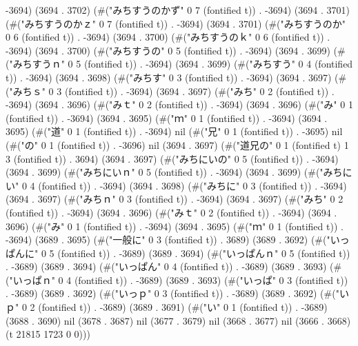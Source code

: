 -3694) (3694 . 3702) (#("みちすうのかず" 0 7 (fontified t)) . -3694) (3694 . 3701) (#("みちすうのかｚ" 0 7 (fontified t)) . -3694) (3694 . 3701) (#("みちすうのか" 0 6 (fontified t)) . -3694) (3694 . 3700) (#("みちすうのｋ" 0 6 (fontified t)) . -3694) (3694 . 3700) (#("みちすうの" 0 5 (fontified t)) . -3694) (3694 . 3699) (#("みちすうｎ" 0 5 (fontified t)) . -3694) (3694 . 3699) (#("みちすう" 0 4 (fontified t)) . -3694) (3694 . 3698) (#("みちす" 0 3 (fontified t)) . -3694) (3694 . 3697) (#("みちｓ" 0 3 (fontified t)) . -3694) (3694 . 3697) (#("みち" 0 2 (fontified t)) . -3694) (3694 . 3696) (#("みｔ" 0 2 (fontified t)) . -3694) (3694 . 3696) (#("み" 0 1 (fontified t)) . -3694) (3694 . 3695) (#("ｍ" 0 1 (fontified t)) . -3694) (3694 . 3695) (#("道" 0 1 (fontified t)) . -3694) nil (#("兄" 0 1 (fontified t)) . -3695) nil (#("の" 0 1 (fontified t)) . -3696) nil (3694 . 3697) (#("道兄の" 0 1 (fontified t) 1 3 (fontified t)) . 3694) (3694 . 3697) (#("みちにいの" 0 5 (fontified t)) . -3694) (3694 . 3699) (#("みちにいｎ" 0 5 (fontified t)) . -3694) (3694 . 3699) (#("みちにい" 0 4 (fontified t)) . -3694) (3694 . 3698) (#("みちに" 0 3 (fontified t)) . -3694) (3694 . 3697) (#("みちｎ" 0 3 (fontified t)) . -3694) (3694 . 3697) (#("みち" 0 2 (fontified t)) . -3694) (3694 . 3696) (#("みｔ" 0 2 (fontified t)) . -3694) (3694 . 3696) (#("み" 0 1 (fontified t)) . -3694) (3694 . 3695) (#("ｍ" 0 1 (fontified t)) . -3694) (3689 . 3695) (#("一般に" 0 3 (fontified t)) . 3689) (3689 . 3692) (#("いっぱんに" 0 5 (fontified t)) . -3689) (3689 . 3694) (#("いっぱんｎ" 0 5 (fontified t)) . -3689) (3689 . 3694) (#("いっぱん" 0 4 (fontified t)) . -3689) (3689 . 3693) (#("いっぱｎ" 0 4 (fontified t)) . -3689) (3689 . 3693) (#("いっぱ" 0 3 (fontified t)) . -3689) (3689 . 3692) (#("いっｐ" 0 3 (fontified t)) . -3689) (3689 . 3692) (#("いｐ" 0 2 (fontified t)) . -3689) (3689 . 3691) (#("い" 0 1 (fontified t)) . -3689) (3688 . 3690) nil (3678 . 3687) nil (3677 . 3679) nil (3668 . 3677) nil (3666 . 3668) (t 21815 1723 0 0)))
